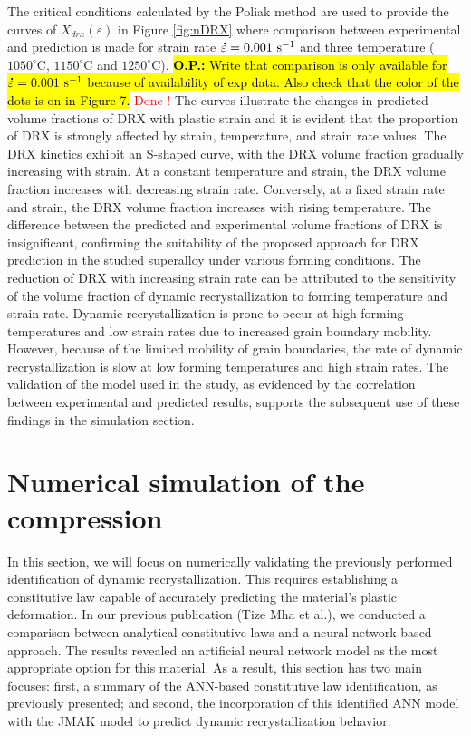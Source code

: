 \documentclass[metals,article,submit,pdftex,moreauthors]{Definitions/mdpi}
\makeatletter
\DeclareRobustCommand{\mdot}[1]{\accentset{\mbox{\bfseries .}}{#1}}
\DeclareRobustCommand{\eal}{et al.\@\xspace}
\DeclareRobustCommand{\ps}{\text{s}^{-1}}
\DeclareRobustCommand{\OP}[1]{\begingroup\sethlcolor{VWyellow}\textcolor{red}{\hl{\textbf{O.P.:} #1}}\endgroup}
\makeatother
\begin{document}
The critical conditions calculated by the Poliak method are used to provide the curves of $X_{drx}(\varepsilon)$ in Figure \ref{fig:nDRX} where comparison between experimental and prediction is made for strain rate $\mdot\varepsilon=0.001~\ps$ and three temperature ($1050^\circ$C, $1150^\circ$C and $1250^\circ$C). \OP{Write that comparison is only available for $\mdot\varepsilon=0.001~\ps$ because of availability of exp data. Also check that the color of the dots is on in Figure 7.} \textcolor{red}{Done !}
The curves illustrate the changes in predicted volume fractions of DRX with plastic strain and it is evident that the proportion of DRX is strongly affected by strain, temperature, and strain rate values.
The DRX kinetics exhibit an S-shaped curve, with the DRX volume fraction gradually increasing with strain.
At a constant temperature and strain, the DRX volume fraction increases with decreasing strain rate.
Conversely, at a fixed strain rate and strain, the DRX volume fraction increases with rising temperature.
The difference between the predicted and experimental volume fractions of DRX is insignificant, confirming the suitability of the proposed approach for DRX prediction in the studied superalloy under various forming conditions.
The reduction of DRX with increasing strain rate can be attributed to the sensitivity of the volume fraction of dynamic recrystallization to forming temperature and strain rate.
Dynamic recrystallization is prone to occur at high forming temperatures and low strain rates due to increased grain boundary mobility.
However, because of the limited mobility of grain boundaries, the rate of dynamic recrystallization is slow at low forming temperatures and high strain rates.
The validation of the model used in the study, as evidenced by the correlation between experimental and predicted results, supports the subsequent use of these findings in the simulation section.

\section{Numerical simulation of the compression\label{sec:NumSim}}
In this section, we will focus on numerically validating the previously performed identification of dynamic recrystallization.
This requires establishing a constitutive law capable of accurately predicting the material's plastic deformation.
In our previous publication (Tize Mha \eal \cite{TizeMha-2023}), we conducted a comparison between analytical constitutive laws and a neural network-based approach.
The results revealed an artificial neural network model as the most appropriate option for this material.
As a result, this section has two main focuses: first, a summary of the ANN-based constitutive law identification, as previously presented; and second, the incorporation of this identified ANN model with the JMAK model to predict dynamic recrystallization behavior.
\end{document}
